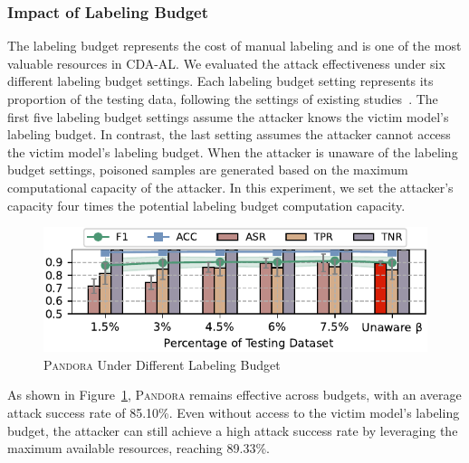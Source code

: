 \documentclass[lettersize,journal]{IEEEtran}
\newcommand{\pandora}{{\scshape Pandora}\xspace}
\begin{document}

\subsubsection{Impact of Labeling Budget}
\label{Sec: Attack Effectiveness under Different Label budget}
The labeling budget represents the cost of manual labeling and is one of the most valuable resources in CDA-AL.
We evaluated the attack effectiveness under six different labeling budget settings.
Each labeling budget setting represents its proportion of the testing data, following the settings of existing studies~\cite{2023-Usenix-chenyizhen}.
The first five labeling budget settings assume the attacker knows the victim model’s labeling budget.
In contrast, the last setting assumes the attacker cannot access the victim model’s labeling budget.
When the attacker is unaware of the labeling budget settings, poisoned samples are generated based on the maximum computational capacity of the attacker. 
In this experiment, we set the attacker’s capacity four times the potential labeling budget computation capacity.
\begin{figure}[h!]
	\centering
	\includegraphics[width=\linewidth,keepaspectratio]{Graph/Evaluation/Figure14_4.pdf}
	\caption{\pandora Under Different Labeling Budget}
	\label{fig:Attack-effectiveness-Label-Budget}
\end{figure}
As shown in Figure~\ref{fig:Attack-effectiveness-Label-Budget}, \pandora remains effective across budgets, with an average attack success rate of 85.10\%.
Even without access to the victim model’s labeling budget, the attacker can still achieve a high attack success rate by leveraging the maximum available resources, reaching 89.33\%.
\end{document}
